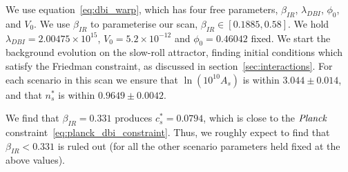     We use equation~\eqref{eq:dbi_warp}, which has four free parameters,
    $\beta_{IR}$, $\lambda_{DBI}$, $\phi_0$, and $V_0$.
    We use $\beta_{IR}$ to parameterise our scan,
    $\beta_{IR}\in[0.1885, 0.58]$.
We hold $\lambda_{DBI}=2.00475\times10^{15}$, $V_0 = 5.2\times10^{-12}$
and $\phi_0 = 0.46042$ fixed.
We start the background evolution on the slow-roll attractor, finding initial conditions which
satisfy the Friedman constraint, as discussed in section~\ref{sec:interactions}.
    For each scenario in this scan we ensure that $\ln\left(10^{10}A_s\right)$
    is within $3.044\pm0.014$,
    and that $n_s^{*}$ is within $0.9649\pm0.0042$.


    We find that $\beta_{IR}=0.331$ produces $c_s^{*}=0.0794$,
    which is close to the $\textit{Planck}$ constraint~\eqref{eq:planck_dbi_constraint}.
    Thus, we roughly expect to find that $\beta_{IR}<0.331$ is ruled out
    (for all the other scenario parameters held fixed at the above values).



